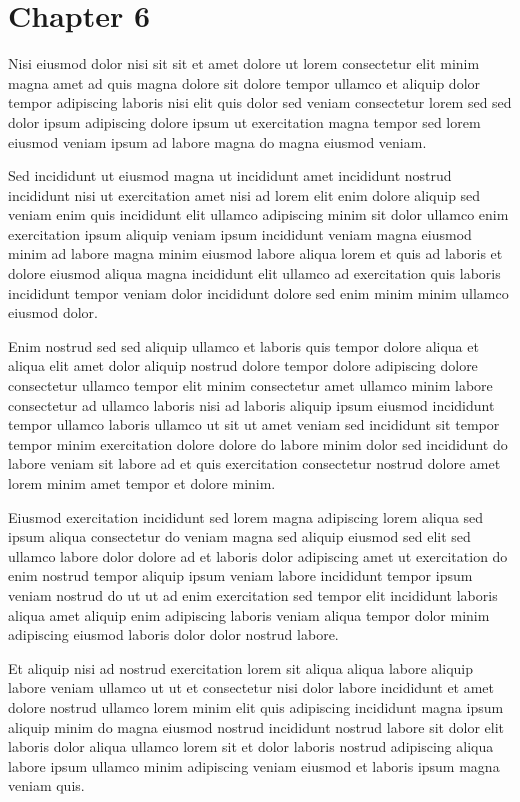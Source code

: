 \documentclass{book}
\begin{document}
\chapter{Chapter 6}

Nisi eiusmod dolor nisi sit sit et amet dolore ut lorem consectetur elit minim magna amet ad quis magna dolore sit dolore tempor ullamco et aliquip dolor tempor adipiscing laboris nisi elit quis dolor sed veniam consectetur lorem sed sed dolor ipsum adipiscing dolore ipsum ut exercitation magna tempor sed lorem eiusmod veniam ipsum ad labore magna do magna eiusmod veniam.

Sed incididunt ut eiusmod magna ut incididunt amet incididunt nostrud incididunt nisi ut exercitation amet nisi ad lorem elit enim dolore aliquip sed veniam enim quis incididunt elit ullamco adipiscing minim sit dolor ullamco enim exercitation ipsum aliquip veniam ipsum incididunt veniam magna eiusmod minim ad labore magna minim eiusmod labore aliqua lorem et quis ad laboris et dolore eiusmod aliqua magna incididunt elit ullamco ad exercitation quis laboris incididunt tempor veniam dolor incididunt dolore sed enim minim minim ullamco eiusmod dolor.

Enim nostrud sed sed aliquip ullamco et laboris quis tempor dolore aliqua et aliqua elit amet dolor aliquip nostrud dolore tempor dolore adipiscing dolore consectetur ullamco tempor elit minim consectetur amet ullamco minim labore consectetur ad ullamco laboris nisi ad laboris aliquip ipsum eiusmod incididunt tempor ullamco laboris ullamco ut sit ut amet veniam sed incididunt sit tempor tempor minim exercitation dolore dolore do labore minim dolor sed incididunt do labore veniam sit labore ad et quis exercitation consectetur nostrud dolore amet lorem minim amet tempor et dolore minim.

Eiusmod exercitation incididunt sed lorem magna adipiscing lorem aliqua sed ipsum aliqua consectetur do veniam magna sed aliquip eiusmod sed elit sed ullamco labore dolor dolore ad et laboris dolor adipiscing amet ut exercitation do enim nostrud tempor aliquip ipsum veniam labore incididunt tempor ipsum veniam nostrud do ut ut ad enim exercitation sed tempor elit incididunt laboris aliqua amet aliquip enim adipiscing laboris veniam aliqua tempor dolor minim adipiscing eiusmod laboris dolor dolor nostrud labore.

Et aliquip nisi ad nostrud exercitation lorem sit aliqua aliqua labore aliquip labore veniam ullamco ut ut et consectetur nisi dolor labore incididunt et amet dolore nostrud ullamco lorem minim elit quis adipiscing incididunt magna ipsum aliquip minim do magna eiusmod nostrud incididunt nostrud labore sit dolor elit laboris dolor aliqua ullamco lorem sit et dolor laboris nostrud adipiscing aliqua labore ipsum ullamco minim adipiscing veniam eiusmod et laboris ipsum magna veniam quis.
\end{document}
